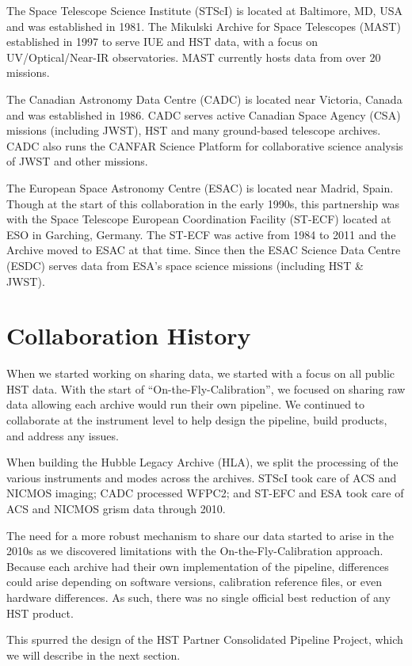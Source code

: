 \documentclass[11pt,twoside]{article}
\begin{document}
The Space Telescope Science Institute (STScI) is located at Baltimore, MD, USA and was established in 1981.
The Mikulski Archive for Space Telescopes (MAST) established in 1997 to serve IUE and HST data, with a focus on UV/Optical/Near-IR observatories. MAST currently hosts data from over 20 missions.

The Canadian Astronomy Data Centre (CADC) is located near Victoria, Canada and was established in 1986.
CADC serves active Canadian Space Agency (CSA) missions (including JWST), HST and many ground-based telescope archives.
CADC also runs the CANFAR Science Platform for collaborative science analysis of JWST and other missions.

The European Space Astronomy Centre (ESAC) is located near Madrid, Spain. Though at the start of this collaboration in the early 1990s, this partnership was with the Space Telescope European Coordination Facility (ST-ECF) located at ESO in Garching, Germany. 
The ST-ECF was active from 1984 to 2011 and the Archive moved to ESAC at that time. 
Since then the ESAC Science Data Centre (ESDC) serves data from ESA's space science missions (including HST \& JWST).

\section{Collaboration History}

When we started working on sharing data, we started with a focus on all public HST data. 
With the start of “On-the-Fly-Calibration”, we focused on sharing raw data allowing each archive would run their own pipeline. 
We continued to collaborate at the instrument level to help design the pipeline, build products, and address any issues.

When building the Hubble Legacy Archive (HLA), we split the processing of the various instruments and modes across the archives. 
STScI took care of ACS and NICMOS imaging; CADC processed WFPC2; and ST-EFC and ESA took care of ACS and NICMOS grism data through 2010. 

The need for a more robust mechanism to share our data started to arise in the 2010s as we discovered limitations with the On-the-Fly-Calibration approach. 
Because each archive had their own implementation of the pipeline, differences could arise depending on software versions, calibration reference files, or even hardware differences. 
As such, there was no single official best reduction of any HST product. 

This spurred the design of the HST Partner Consolidated Pipeline Project, which we will describe in the next section.
\end{document}
